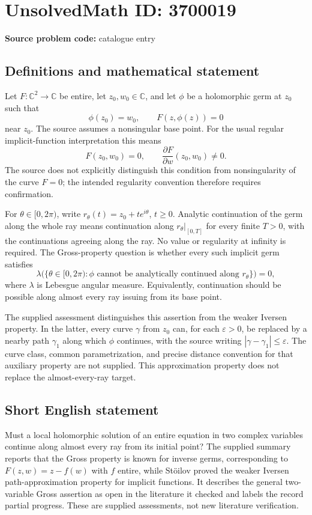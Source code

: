 \documentclass[11pt]{article}
\newcommand{\C}{\mathbb{C}}
\begin{document}
\section*{UnsolvedMath ID: 3700019}
\textbf{Source problem code:} catalogue entry
\subsection{Definitions and mathematical statement}
Let $F:\C^2\to\C$ be entire, let $z_0,w_0\in\C$, and let $\phi$ be a holomorphic germ at $z_0$ such that
\[
 \phi(z_0)=w_0,\qquad F(z,\phi(z))=0
\]
near $z_0$. The source assumes a nonsingular base point. For the usual regular implicit-function interpretation this means
\[
 F(z_0,w_0)=0,\qquad \frac{\partial F}{\partial w}(z_0,w_0)\ne0.
\]
The source does not explicitly distinguish this condition from nonsingularity of the curve $F=0$; the intended regularity convention therefore requires confirmation.

For $\theta\in[0,2\pi)$, write $r_\theta(t)=z_0+t e^{i\theta}$, $t\ge0$. Analytic continuation of the germ along the whole ray means continuation along $r_\theta|_{[0,T]}$ for every finite $T>0$, with the continuations agreeing along the ray. No value or regularity at infinity is required. The Gross-property question is whether every such implicit germ satisfies
\[
 \lambda\bigl(\{\theta\in[0,2\pi):
 \phi\text{ cannot be analytically continued along }r_\theta\}\bigr)=0,
\]
where $\lambda$ is Lebesgue angular measure. Equivalently, continuation should be possible along almost every ray issuing from its base point.

The supplied assessment distinguishes this assertion from the weaker Iversen property. In the latter, every curve $\gamma$ from $z_0$ can, for each $\varepsilon>0$, be replaced by a nearby path $\gamma_1$ along which $\phi$ continues, with the source writing $|\gamma-\gamma_1|\le\varepsilon$. The curve class, common parametrization, and precise distance convention for that auxiliary property are not supplied. This approximation property does not replace the almost-every-ray target.
\subsection{Short English statement}
Must a local holomorphic solution of an entire equation in two complex variables continue along almost every ray from its initial point? The supplied summary reports that the Gross property is known for inverse germs, corresponding to $F(z,w)=z-f(w)$ with $f$ entire, while Stöilov proved the weaker Iversen path-approximation property for implicit functions. It describes the general two-variable Gross assertion as open in the literature it checked and labels the record partial progress. These are supplied assessments, not new literature verification.
\end{document}
